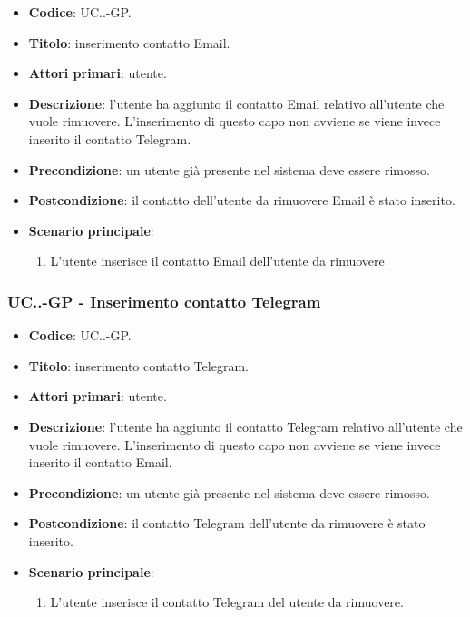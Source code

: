 				\begin{itemize}
					\item \textbf{Codice}: UC\theuccount.\thesubuccount.\thesubsubuccount-GP.
					\item \textbf{Titolo}: inserimento contatto Email.
					\item \textbf{Attori primari}: utente.
					\item \textbf{Descrizione}: l'utente ha aggiunto il contatto Email relativo all'utente che vuole rimuovere. L'inserimento di questo capo non avviene se viene invece inserito il contatto Telegram.
					\item \textbf{Precondizione}: un utente già presente nel sistema deve essere rimosso.
					\item \textbf{Postcondizione}: il contatto dell'utente da rimuovere Email è stato inserito.
					\item \textbf{Scenario principale}:
					\begin{enumerate}
						\item L'utente inserisce il contatto Email dell'utente da rimuovere
					\end{enumerate}
				\end{itemize}

			\subsubsection{UC\theuccount.\thesubuccount.\thesubsubuccount-GP - Inserimento contatto Telegram}

				\begin{itemize}
					\item \textbf{Codice}: UC\theuccount.\thesubuccount.\thesubsubuccount-GP.
					\item \textbf{Titolo}: inserimento contatto Telegram.
					\item \textbf{Attori primari}: utente.
					\item \textbf{Descrizione}: l'utente ha aggiunto il contatto Telegram relativo all'utente che vuole \newline rimuovere. L'inserimento di questo capo non avviene se viene invece inserito il contatto Email.
					\item \textbf{Precondizione}: un utente già presente nel sistema deve essere rimosso.
					\item \textbf{Postcondizione}: il contatto Telegram dell'utente da rimuovere è stato inserito.
					\item \textbf{Scenario principale}:
					\begin{enumerate}
						\item L'utente inserisce il contatto Telegram del utente da rimuovere.
					\end{enumerate}
				\end{itemize}

